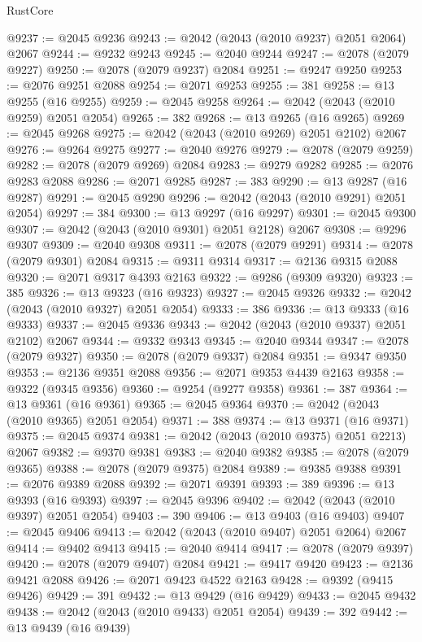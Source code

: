 \begin{lexlean}{RustCore}
\begin{coremodule}
@9237 := @2045 @9236
@9243 := @2042 (@2043 (@2010 @9237) @2051 @2064) @2067
@9244 := @9232 @9243
@9245 := @2040 @9244
@9247 := @2078 (@2079 @9227)
@9250 := @2078 (@2079 @9237) @2084
@9251 := @9247 @9250
@9253 := @2076 @9251 @2088
@9254 := @2071 @9253
@9255 := 381
@9258 := @13 @9255 (@16 @9255)
@9259 := @2045 @9258
@9264 := @2042 (@2043 (@2010 @9259) @2051 @2054)
@9265 := 382
@9268 := @13 @9265 (@16 @9265)
@9269 := @2045 @9268
@9275 := @2042 (@2043 (@2010 @9269) @2051 @2102) @2067
@9276 := @9264 @9275
@9277 := @2040 @9276
@9279 := @2078 (@2079 @9259)
@9282 := @2078 (@2079 @9269) @2084
@9283 := @9279 @9282
@9285 := @2076 @9283 @2088
@9286 := @2071 @9285
@9287 := 383
@9290 := @13 @9287 (@16 @9287)
@9291 := @2045 @9290
@9296 := @2042 (@2043 (@2010 @9291) @2051 @2054)
@9297 := 384
@9300 := @13 @9297 (@16 @9297)
@9301 := @2045 @9300
@9307 := @2042 (@2043 (@2010 @9301) @2051 @2128) @2067
@9308 := @9296 @9307
@9309 := @2040 @9308
@9311 := @2078 (@2079 @9291)
@9314 := @2078 (@2079 @9301) @2084
@9315 := @9311 @9314
@9317 := @2136 @9315 @2088
@9320 := @2071 @9317 @4393 @2163
@9322 := @9286 (@9309 @9320)
@9323 := 385
@9326 := @13 @9323 (@16 @9323)
@9327 := @2045 @9326
@9332 := @2042 (@2043 (@2010 @9327) @2051 @2054)
@9333 := 386
@9336 := @13 @9333 (@16 @9333)
@9337 := @2045 @9336
@9343 := @2042 (@2043 (@2010 @9337) @2051 @2102) @2067
@9344 := @9332 @9343
@9345 := @2040 @9344
@9347 := @2078 (@2079 @9327)
@9350 := @2078 (@2079 @9337) @2084
@9351 := @9347 @9350
@9353 := @2136 @9351 @2088
@9356 := @2071 @9353 @4439 @2163
@9358 := @9322 (@9345 @9356)
@9360 := @9254 (@9277 @9358)
@9361 := 387
@9364 := @13 @9361 (@16 @9361)
@9365 := @2045 @9364
@9370 := @2042 (@2043 (@2010 @9365) @2051 @2054)
@9371 := 388
@9374 := @13 @9371 (@16 @9371)
@9375 := @2045 @9374
@9381 := @2042 (@2043 (@2010 @9375) @2051 @2213) @2067
@9382 := @9370 @9381
@9383 := @2040 @9382
@9385 := @2078 (@2079 @9365)
@9388 := @2078 (@2079 @9375) @2084
@9389 := @9385 @9388
@9391 := @2076 @9389 @2088
@9392 := @2071 @9391
@9393 := 389
@9396 := @13 @9393 (@16 @9393)
@9397 := @2045 @9396
@9402 := @2042 (@2043 (@2010 @9397) @2051 @2054)
@9403 := 390
@9406 := @13 @9403 (@16 @9403)
@9407 := @2045 @9406
@9413 := @2042 (@2043 (@2010 @9407) @2051 @2064) @2067
@9414 := @9402 @9413
@9415 := @2040 @9414
@9417 := @2078 (@2079 @9397)
@9420 := @2078 (@2079 @9407) @2084
@9421 := @9417 @9420
@9423 := @2136 @9421 @2088
@9426 := @2071 @9423 @4522 @2163
@9428 := @9392 (@9415 @9426)
@9429 := 391
@9432 := @13 @9429 (@16 @9429)
@9433 := @2045 @9432
@9438 := @2042 (@2043 (@2010 @9433) @2051 @2054)
@9439 := 392
@9442 := @13 @9439 (@16 @9439)

\end{coremodule}
\end{lexlean}
